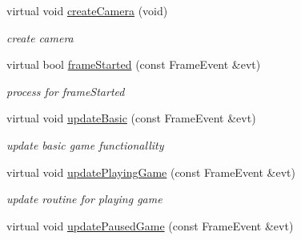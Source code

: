 \begin{DoxyCompactItemize}
\item 
virtual void \hyperlink{class_basic_tutorial__00_a1bf709417d654dffc2ea10987412b912}{create\+Camera} (void)\hypertarget{class_basic_tutorial__00_a1bf709417d654dffc2ea10987412b912}{}\label{class_basic_tutorial__00_a1bf709417d654dffc2ea10987412b912}

\begin{DoxyCompactList}\small\item\em create camera \end{DoxyCompactList}\item 
virtual bool \hyperlink{class_basic_tutorial__00_aa02aec0fcd3211e00bcb6d6d259a1ec6}{frame\+Started} (const Frame\+Event \&evt)\hypertarget{class_basic_tutorial__00_aa02aec0fcd3211e00bcb6d6d259a1ec6}{}\label{class_basic_tutorial__00_aa02aec0fcd3211e00bcb6d6d259a1ec6}

\begin{DoxyCompactList}\small\item\em process for frame\+Started \end{DoxyCompactList}\item 
virtual void \hyperlink{class_basic_tutorial__00_ace40938ce3e816495bdb46743db100d6}{update\+Basic} (const Frame\+Event \&evt)\hypertarget{class_basic_tutorial__00_ace40938ce3e816495bdb46743db100d6}{}\label{class_basic_tutorial__00_ace40938ce3e816495bdb46743db100d6}

\begin{DoxyCompactList}\small\item\em update basic game functionallity \end{DoxyCompactList}\item 
virtual void \hyperlink{class_basic_tutorial__00_a8c9934b2cef28309cd70752e72bebc1d}{update\+Playing\+Game} (const Frame\+Event \&evt)\hypertarget{class_basic_tutorial__00_a8c9934b2cef28309cd70752e72bebc1d}{}\label{class_basic_tutorial__00_a8c9934b2cef28309cd70752e72bebc1d}

\begin{DoxyCompactList}\small\item\em update routine for playing game \end{DoxyCompactList}\item 
virtual void \hyperlink{class_basic_tutorial__00_a65d00df4d4b3cfab41e7779a5830c8a3}{update\+Paused\+Game} (const Frame\+Event \&evt)\hypertarget{class_basic_tutorial__00_a65d00df4d4b3cfab41e7779a5830c8a3}{}\label{class_basic_tutorial__00_a65d00df4d4b3cfab41e7779a5830c8a3}


\end{DoxyCompactItemize}
